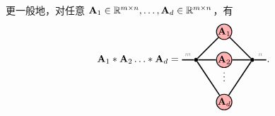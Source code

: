更一般地，对任意 $\mathbf{A}_1\in\mathbb{R}^{m\times n},\dots,\mathbf{A}_d\in\mathbb{R}^{m\times n}$，有 
\begin{align*}
\Ab_1\hadam\Ab_2\dots\hadam\Ab_{d} 
=
    \begin{tikzpicture}[baseline=\baseline]
    \tikzset{tensor/.style = {minimum size = 0.5cm,shape = circle,thick,draw=black,inner sep = 0pt}, edge/.style   = {thick,line width=.4mm},every loop/.style={}}
    \def\y{1}
    \def\x{0}
    \node[tensor,fill=red!30!white] (A_1) at (\x,\y){$\Ab_1$};
    \node[tensor,fill=red!30!white] (A_2) at (\x,\y-1){$\Ab_2$};
    \node[draw=none] at (\x,\y-1.5) {\scalebox{1}{\textcolor{black}{$\vdots$}}};
    \node[tensor,fill=red!30!white] (A_N) at (\x,\y-2.5){$\Ab_d$};
    \draw  node[fill = black,circle,inner sep=0pt,minimum size=4pt] (m) at (\x+1,\y-1) {};
    \draw  node[fill = black,circle,inner sep=0pt,minimum size=4pt] (n) at (\x-1,\y-1) {};
    \draw[edge] (A_1) -- (m);
    \draw[edge] (A_2) -- (m);
    \draw[edge] (A_N) -- (m);
    \draw[edge] (A_1) -- (n);
    \draw[edge] (A_2) -- (n);
    \draw[edge] (A_N) -- (n);
    \draw[edge] (m) -- (\x+1.5,\y-1)node [midway,above] {\edgelabel{$n$}};
    \draw[edge] (n) -- (\x-1.5,\y-1)node [midway,above] {\edgelabel{$m$}};
    \end{tikzpicture}.
\end{align*}
